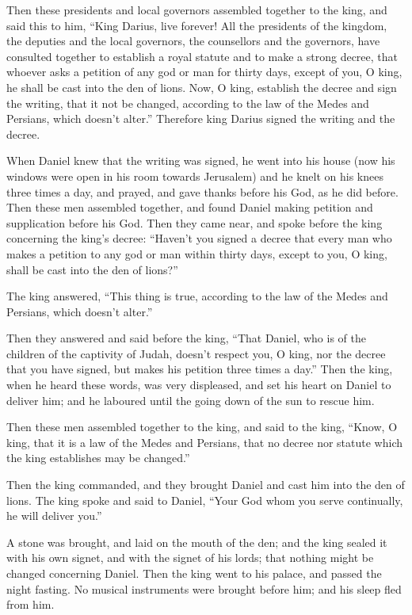  Then these presidents and local governors assembled
together to the king, and said this to him, ``King Darius, live forever!
 All the presidents of the kingdom, the deputies and the
local governors, the counsellors and the governors, have consulted
together to establish a royal statute and to make a strong decree, that
whoever asks a petition of any god or man for thirty days, except of
you, O king, he shall be cast into the den of lions.  Now,
O king, establish the decree and sign the writing, that it not be
changed, according to the law of the Medes and Persians, which doesn't
alter.''  Therefore king Darius signed the writing and the
decree.

 When Daniel knew that the writing was signed, he went
into his house (now his windows were open in his room towards Jerusalem)
and he knelt on his knees three times a day, and prayed, and gave thanks
before his God, as he did before.  Then these men
assembled together, and found Daniel making petition and supplication
before his God.  Then they came near, and spoke before
the king concerning the king's decree: ``Haven't you signed a decree
that every man who makes a petition to any god or man within thirty
days, except to you, O king, shall be cast into the den of lions?''

The king answered, ``This thing is true, according to the law of the
Medes and Persians, which doesn't alter.''

 Then they answered and said before the king, ``That
Daniel, who is of the children of the captivity of Judah, doesn't
respect you, O king, nor the decree that you have signed, but makes his
petition three times a day.''  Then the king, when he
heard these words, was very displeased, and set his heart on Daniel to
deliver him; and he laboured until the going down of the sun to rescue
him.

 Then these men assembled together to the king, and said
to the king, ``Know, O king, that it is a law of the Medes and Persians,
that no decree nor statute which the king establishes may be changed.''

 Then the king commanded, and they brought Daniel and
cast him into the den of lions. The king spoke and said to Daniel,
``Your God whom you serve continually, he will deliver you.''

 A stone was brought, and laid on the mouth of the den;
and the king sealed it with his own signet, and with the signet of his
lords; that nothing might be changed concerning Daniel. 
Then the king went to his palace, and passed the night fasting. No
musical instruments were brought before him; and his sleep fled from
him.

